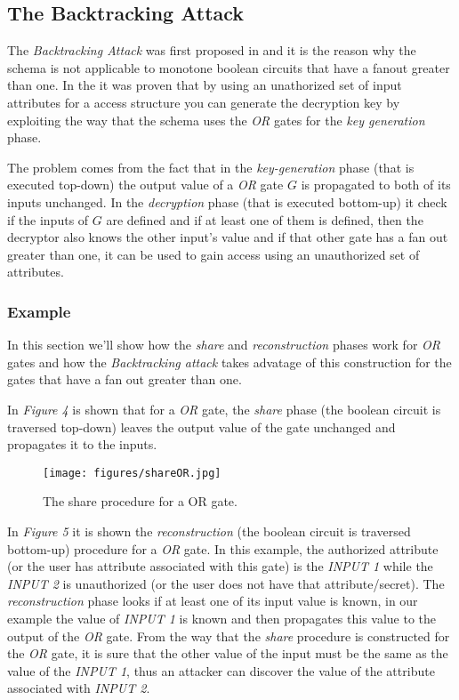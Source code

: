 \documentclass[12pt]{article}
\begin{document}
\subsection{The Backtracking Attack}

The \textit{Backtracking Attack} was first proposed in \cite{gghsw} and it is the reason why the \cite{gpsw} schema is not applicable to monotone boolean circuits that have a fanout greater than one. In the \cite{gghsw} it was proven that by using an unathorized set of input attributes for a access structure you can generate the decryption key by exploiting the way that the schema uses the \textit{OR} gates for the \textit{key generation} phase.

The problem comes from the fact that in the \textit{key-generation} phase (that is executed top-down) the output value of a \textit{OR} gate $G$ is propagated to both of its inputs unchanged. In the \textit{decryption} phase (that is executed bottom-up) it check if the inputs of $G$ are defined and if at least one of them is defined, then the decryptor also knows the other input's value and if that other gate has a fan out greater than one, it can be used to gain access using an unauthorized set of attributes.

\subsubsection{Example}

In this section we'll show how the \textit{share} and \textit{reconstruction} phases work for \textit{OR} gates and how the \textit{Backtracking attack} takes advatage of this construction for the gates that have a fan out greater than one.

In \textit{Figure 4} is shown that for a \textit{OR} gate, the \textit{share} phase (the boolean circuit is traversed top-down) leaves the output value of the gate unchanged and propagates it to the inputs. 

\begin{center}
	\begin{figure}[htpb]
\centering
\texttt{[image: figures/shareOR.jpg]}
\caption{
	The share procedure for a OR gate.
}
\end{figure}
\end{center}

In \textit{Figure 5} it is shown the \textit{reconstruction} (the boolean circuit is traversed bottom-up) procedure for a \textit{OR} gate. In this example, the authorized attribute (or the user has attribute associated with this gate) is the \textit{INPUT 1} while the \textit{INPUT 2} is unauthorized (or the user does not have that attribute/secret). The \textit{reconstruction} phase looks if at least one of its input value is known, in our example the value of \textit{INPUT 1} is known and then propagates this value to the output of the \textit{OR} gate. From the way that the \textit{share} procedure is constructed for the \textit{OR} gate, it is sure that the other value of the input must be the same as the value of the \textit{INPUT 1}, thus an attacker can discover the value of the attribute associated with \textit{INPUT 2}.
\end{document}
